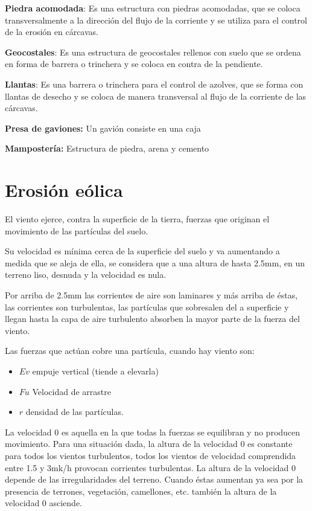    \textbf{Piedra acomodada}: Es una estructura con piedras acomodadas, que se coloca transversalmente a la dirección del flujo de la corriente y se utiliza para el control de la erosión en cárcavas.
    
    \textbf{Geocostales}: Es una estructura de geocostales rellenos con suelo que se ordena en forma de barrera o trinchera y se coloca en contra de la pendiente. 
    
    \textbf{Llantas}: Es una barrera o trinchera para el control de azolves, que se forma con llantas de desecho y se coloca de manera transversal al flujo de la corriente de las cárcavas.
    
    
    \textbf{Presa de gaviones:} Un gavión consiste en una caja
    
    \textbf{Mampostería:} Estructura de piedra, arena y cemento
    
    \section{Erosión eólica}
    
    El viento ejerce, contra la superficie de la tierra, fuerzas que originan el movimiento de las partículas del suelo.
    
    Su velocidad es mínima cerca de la superficie del suelo y va aumentando a medida que se aleja de ella, se considera que a una altura de hasta 2.5mm, en un terreno liso, desnuda y la velocidad es nula.
    
    Por arriba de 2.5mm las corrientes de aire son laminares y más arriba de éstas, las corrientes son turbulentas, las partículas que sobresalen del a superficie y llegan hasta la capa de aire turbulento absorben la mayor parte de la fuerza del viento.
    
    Las fuerzas que actúan cobre una partícula, cuando hay viento son:
    \begin{itemize}
        \item $Ev$ empuje vertical (tiende a elevarla)
        \item $Fu$ Velocidad de arrastre
        \item $r$ densidad de las partículas.
    \end{itemize}
    
    La velocidad 0 es aquella en la que todas la fuerzas se equilibran y no producen movimiento. Para una situación dada, la altura de la velocidad 0 es constante para todos los vientos turbulentos, todos los vientos de velocidad comprendida entre 1.5 y 3mk/h provocan corrientes turbulentas. La altura de la velocidad 0 depende de las irregularidades del terreno. Cuando éstas aumentan ya sea por la presencia de terrones, vegetación, camellones, etc. también la altura de la velocidad 0 asciende.
    
